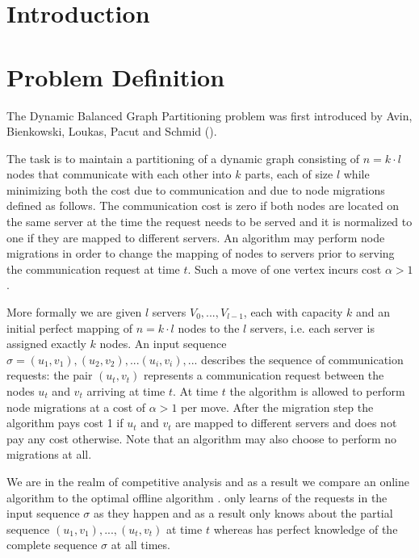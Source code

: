 \documentclass[a4paper,xcolor=dvipsnames, tikz, 12pt]{article}
\newcommand{\opt}{\text{O{\scriptsize PT}}}
\newcommand{\onl}{\text{O{\scriptsize NL}}}
\theoremstyle{definition}
\begin{document}
{
	\hypersetup{linkcolor=black}
	\tableofcontents
	\thispagestyle{empty}
	\clearpage
}


	\section{Introduction}
	
	
	\section{Problem Definition}
	
	The Dynamic Balanced Graph Partitioning problem was first introduced by Avin, Bienkowski, Loukas, Pacut and Schmid (\cite{Avin2015a}).
	
	The task is to maintain a partitioning of a dynamic graph consisting of $n=k\cdot l$ nodes that communicate with each other into $k$ parts, each of size $l$ while minimizing both the cost due to communication and due to node migrations defined as follows. The communication cost is zero if both nodes are located on the same server at the time the request needs to be served and it is normalized to one if they are mapped to different servers. An algorithm may perform node migrations in order to change the mapping of nodes to servers prior to serving the communication request at time $t$. Such a move of one vertex incurs cost $\alpha>1$.
	
	More formally we are given $l$ servers $V_0,...,V_{l-1}$, each with capacity $k$ and an initial perfect mapping of $n=k\cdot l$ nodes to the $l$ servers, i.e. each server is assigned exactly $k$ nodes. An input sequence $\sigma=(u_1, v_1), (u_2, v_2),...(u_i,v_i),...$ describes the sequence of communication requests: the pair $(u_t, v_t)$ represents a communication request between the nodes $u_t$ and $v_t$ arriving at time $t$. At time $t$ the algorithm is allowed to perform node migrations at a cost of $\alpha>1$ per move. After the migration step the algorithm pays cost 1 if $u_t$ and $v_t$ are mapped to different servers and does not pay any cost otherwise. Note that an algorithm may also choose to perform no migrations at all.
	
	We are in the realm of competitive analysis and as a result we compare an online algorithm \onl{} to the optimal offline algorithm \opt{}. \onl{} only learns of the requests in the input sequence $\sigma$ as they happen and as a result only knows about the partial sequence $(u_1,v_1),...,(u_t,v_t)$ at time $t$ whereas \opt{} has perfect knowledge of the complete sequence $\sigma$ at all times.
	
\end{document}
